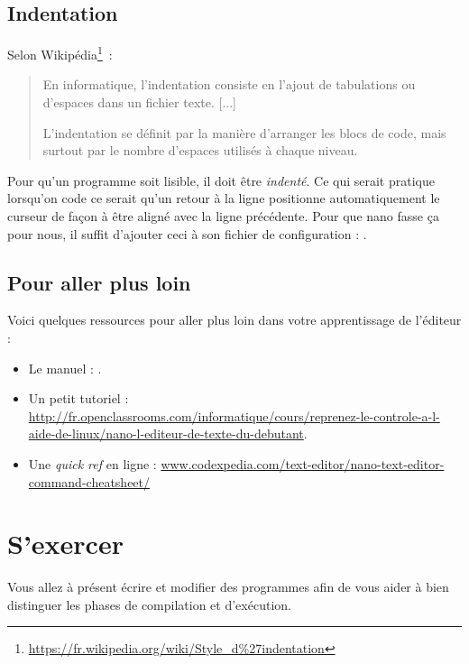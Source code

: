 \documentclass[a4paper,11pt]{style-esi/td}
\begin{document}
	\subsection{Indentation}
				 
        Selon Wikipédia\footnote{\url{https://fr.wikipedia.org/wiki/Style_d\%27indentation}}~:
        \begin{quote}
        En informatique, l'indentation consiste en l'ajout de tabulations ou 
        d'espaces dans un fichier texte. [...]

        L'indentation se définit par la manière d'arranger les blocs de code, 
        mais surtout par le nombre d'espaces utilisés à chaque niveau. 
        \end{quote}
        
		Pour qu'un programme soit lisible, 
		il doit être \textit{indenté}. 
		Ce qui serait pratique lorsqu'on code ce serait qu'un retour à la ligne 
		positionne automatiquement le curseur de façon à être aligné avec la ligne précédente. 
		Pour que nano fasse ça pour nous, 
		il suffit d'ajouter	ceci à son fichier de configuration : .
			
	\subsection{Pour aller plus loin} 
		
		Voici quelques ressources pour aller plus loin dans votre apprentissage de l'éditeur :
		\begin{itemize}
		\item Le manuel : .
		\item Un petit tutoriel : 
			\\{\tiny\url{http://fr.openclassrooms.com/informatique/cours/reprenez-le-controle-a-l-aide-de-linux/nano-l-editeur-de-texte-du-debutant}}.
		\item Une \textit{quick ref} en ligne : 
		\url{www.codexpedia.com/text-editor/nano-text-editor-command-cheatsheet/}
		\end{itemize}	

\section{S'exercer}  

	Vous allez à présent écrire et modifier des programmes
	afin de vous aider à bien distinguer les phases de compilation et d'exécution. 
\end{document}
